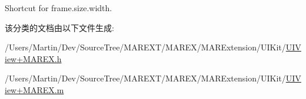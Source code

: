 Shortcut for frame.\+size.\+width. 



该分类的文档由以下文件生成\+:\begin{DoxyCompactItemize}
\item 
/\+Users/\+Martin/\+Dev/\+Source\+Tree/\+M\+A\+R\+E\+X\+T/\+M\+A\+R\+E\+X/\+M\+A\+R\+Extension/\+U\+I\+Kit/\hyperlink{_u_i_view_09_m_a_r_e_x_8h}{U\+I\+View+\+M\+A\+R\+E\+X.\+h}\item 
/\+Users/\+Martin/\+Dev/\+Source\+Tree/\+M\+A\+R\+E\+X\+T/\+M\+A\+R\+E\+X/\+M\+A\+R\+Extension/\+U\+I\+Kit/\hyperlink{_u_i_view_09_m_a_r_e_x_8m}{U\+I\+View+\+M\+A\+R\+E\+X.\+m}\end{DoxyCompactItemize}
